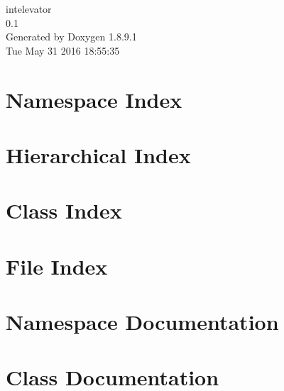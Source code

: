 \documentclass[twoside]{book}
\newcommand{\+}{\discretionary{\mbox{\scriptsize$\hookleftarrow$}}{}{}}
\newcommand{\clearemptydoublepage}{%
  \newpage{\pagestyle{empty}\cleardoublepage}%
}
\begin{document}
\hypersetup{pageanchor=false,
             bookmarks=true,
             bookmarksnumbered=true,
             pdfencoding=unicode
            }
\begin{titlepage}
\vspace*{7cm}
\begin{center}%
{\Large intelevator \\[1ex]\large 0.\+1 }\\
\vspace*{1cm}
{\large Generated by Doxygen 1.8.9.1}\\
\vspace*{0.5cm}
{\small Tue May 31 2016 18:55:35}\\
\end{center}
\end{titlepage}
\clearemptydoublepage
\tableofcontents
\clearemptydoublepage
{}
\hypersetup{pageanchor=true}

\chapter{Namespace Index}

\chapter{Hierarchical Index}

\chapter{Class Index}

\chapter{File Index}

\chapter{Namespace Documentation}


\chapter{Class Documentation}


































\end{document}
